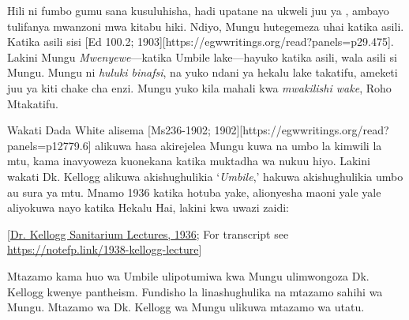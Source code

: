 Hili ni fumbo gumu sana kusuluhisha, hadi upatane na ukweli juu ya , ambayo tulifanya mwanzoni mwa kitabu hiki. Ndiyo, Mungu hutegemeza uhai katika asili. Katika asili sisi [Ed 100.2; 1903][https://egwwritings.org/read?panels=p29.475]. Lakini Mungu \textit{Mwenyewe}—katika Umbile lake—hayuko katika asili, wala asili si Mungu. Mungu ni \textit{huluki binafsi}, na yuko ndani ya hekalu lake takatifu, ameketi juu ya kiti chake cha enzi. Mungu yuko kila mahali kwa \textit{mwakilishi wake}, Roho Mtakatifu.

Wakati Dada White alisema [Ms236-1902; 1902][https://egwwritings.org/read?panels=p12779.6] alikuwa hasa akirejelea Mungu kuwa na umbo la kimwili la mtu, kama inavyoweza kuonekana katika muktadha wa nukuu hiyo. Lakini wakati Dk. Kellogg alikuwa akishughulikia ‘\textit{Umbile},’ hakuwa akishughulikia umbo au sura ya mtu. Mnamo 1936 katika hotuba yake, alionyesha maoni yale yale aliyokuwa nayo katika Hekalu Hai, lakini kwa uwazi zaidi:


[\href{https://forgotten-pillar.s3.us-east-2.amazonaws.com/Sanitarium+Lecture+1936.pdf}{Dr. Kellogg Sanitarium Lectures, 1936}; For transcript see \href{https://notefp.link/1938-kellogg-lecture}{https://notefp.link/1938-kellogg-lecture}]

Mtazamo kama huo wa Umbile ulipotumiwa kwa Mungu ulimwongoza Dk. Kellogg kwenye pantheism. Fundisho la  linashughulika na mtazamo sahihi wa Mungu. Mtazamo wa Dk. Kellogg wa Mungu ulikuwa mtazamo wa utatu.

